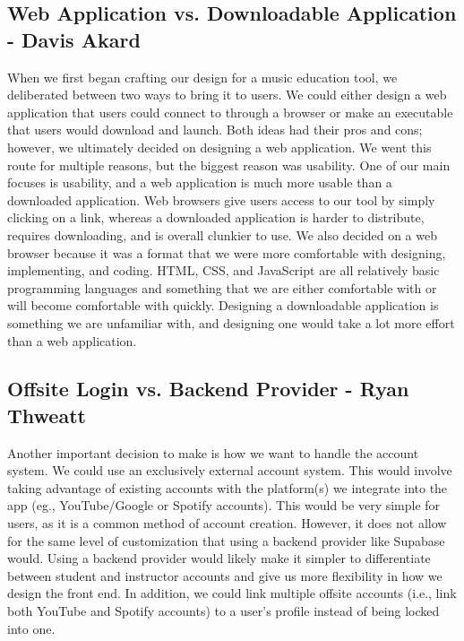 \documentclass[12pt, letterpaper]{article}
\begin{document}
\subsection*{Web Application vs. Downloadable Application - Davis Akard}
When we first began crafting our design for a music education tool, we deliberated between two ways to bring it to users. We could either design a web application that users could connect to through a browser or make an executable that users would download and launch. Both ideas had their pros and cons; however, we ultimately decided on designing a web application. We went this route for multiple reasons, but the biggest reason was usability. One of our main focuses is usability, and a web application is much more usable than a downloaded application. Web browsers give users access to our tool by simply clicking on a link, whereas a downloaded application is harder to distribute, requires downloading, and is overall clunkier to use. We also decided on a web browser because it was a format that we were more comfortable with designing, implementing, and coding. HTML, CSS, and JavaScript are all relatively basic programming languages and something that we are either comfortable with or will become comfortable with quickly. Designing a downloadable application is something we are unfamiliar with, and designing one would take a lot more effort than a web application.

\subsection*{Offsite Login vs. Backend Provider - Ryan Thweatt}
Another important decision to make is how we want to handle the account system. We could use an exclusively external account system. This would involve taking advantage of existing accounts with the platform(s) we integrate into the app (eg., YouTube/Google or Spotify accounts). This would be very simple for users, as it is a common method of account creation. However, it does not allow for the same level of customization that using a backend provider like Supabase would. Using a backend provider would likely make it simpler to differentiate between student and instructor accounts and give us more flexibility in how we design the front end. In addition, we could link multiple offsite accounts (i.e., link both YouTube and Spotify accounts) to a user’s profile instead of being locked into one.
\end{document}
